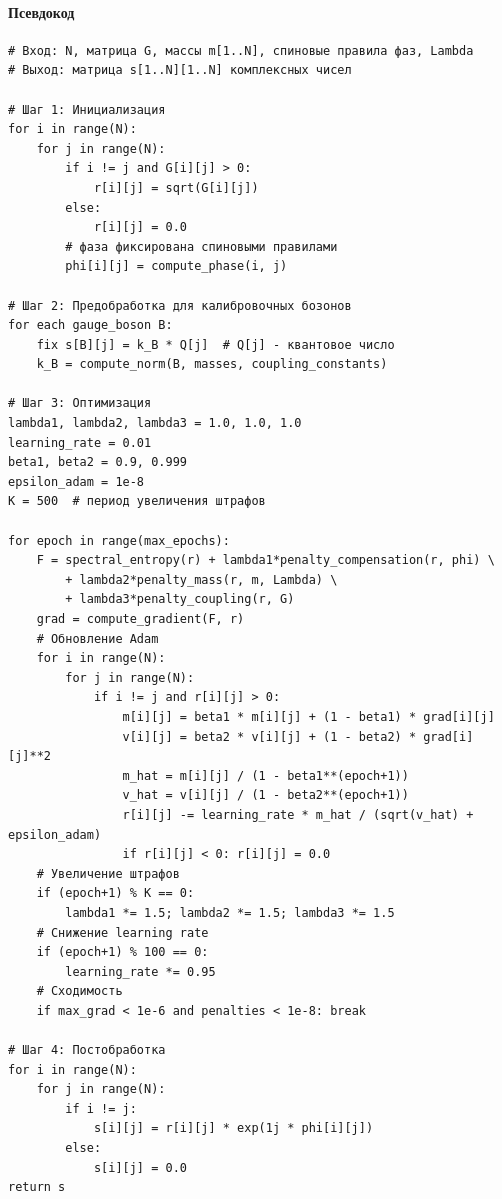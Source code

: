 \documentclass[12pt,a4paper]{article}
\begin{document}
\paragraph{Псевдокод}
\begin{verbatim}
# Вход: N, матрица G, массы m[1..N], спиновые правила фаз, Lambda
# Выход: матрица s[1..N][1..N] комплексных чисел

# Шаг 1: Инициализация
for i in range(N):
    for j in range(N):
        if i != j and G[i][j] > 0:
            r[i][j] = sqrt(G[i][j])
        else:
            r[i][j] = 0.0
        # фаза фиксирована спиновыми правилами
        phi[i][j] = compute_phase(i, j)

# Шаг 2: Предобработка для калибровочных бозонов
for each gauge_boson B:
    fix s[B][j] = k_B * Q[j]  # Q[j] - квантовое число
    k_B = compute_norm(B, masses, coupling_constants)

# Шаг 3: Оптимизация
lambda1, lambda2, lambda3 = 1.0, 1.0, 1.0
learning_rate = 0.01
beta1, beta2 = 0.9, 0.999
epsilon_adam = 1e-8
K = 500  # период увеличения штрафов

for epoch in range(max_epochs):
    F = spectral_entropy(r) + lambda1*penalty_compensation(r, phi) \
        + lambda2*penalty_mass(r, m, Lambda) \
        + lambda3*penalty_coupling(r, G)
    grad = compute_gradient(F, r)
    # Обновление Adam
    for i in range(N):
        for j in range(N):
            if i != j and r[i][j] > 0:
                m[i][j] = beta1 * m[i][j] + (1 - beta1) * grad[i][j]
                v[i][j] = beta2 * v[i][j] + (1 - beta2) * grad[i][j]**2
                m_hat = m[i][j] / (1 - beta1**(epoch+1))
                v_hat = v[i][j] / (1 - beta2**(epoch+1))
                r[i][j] -= learning_rate * m_hat / (sqrt(v_hat) + epsilon_adam)
                if r[i][j] < 0: r[i][j] = 0.0
    # Увеличение штрафов
    if (epoch+1) % K == 0:
        lambda1 *= 1.5; lambda2 *= 1.5; lambda3 *= 1.5
    # Снижение learning rate
    if (epoch+1) % 100 == 0:
        learning_rate *= 0.95
    # Сходимость
    if max_grad < 1e-6 and penalties < 1e-8: break

# Шаг 4: Постобработка
for i in range(N):
    for j in range(N):
        if i != j:
            s[i][j] = r[i][j] * exp(1j * phi[i][j])
        else:
            s[i][j] = 0.0
return s
\end{verbatim}
\end{document}
